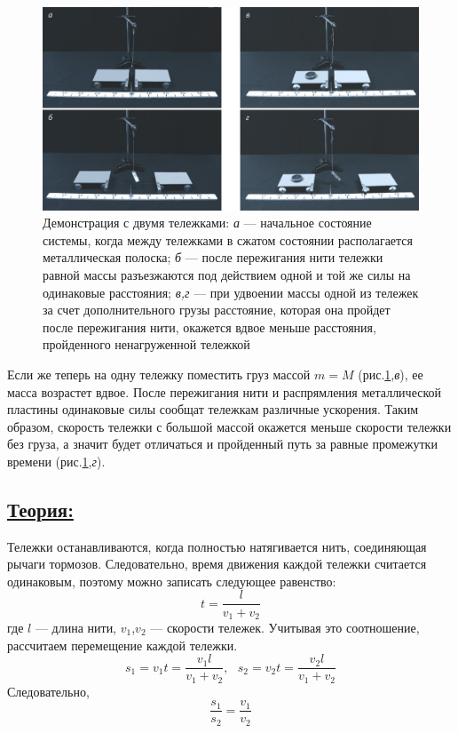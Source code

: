 \documentclass[14pt,a4paper,oneside]{extarticle}	%
\begin{document}
\begin{figure}[H]
	\centering
	\includegraphics[width=1\linewidth]{newton-2.png}
	\caption{Демонстрация с двумя тележками: \textit{а} — начальное состояние системы, когда между тележками в сжатом состоянии располагается металлическая полоска; \textit{б} — после пережигания нити тележки равной массы разъезжаются под действием одной и той же силы на одинаковые расстояния; \textit{в,г} — при удвоении массы одной из тележек за счет дополнительного грузы расстояние, которая она пройдет после пережигания нити, окажется вдвое меньше расстояния, пройденного ненагруженной тележкой}
	\label{newton-2}
\end{figure}

Если же теперь на одну тележку поместить груз массой  $ m=M $ (рис.\ref{newton-2},\textit{в}), ее масса возрастет вдвое.
После пережигания нити и распрямления металлической пластины одинаковые силы сообщат тележкам различные ускорения.
Таким образом, скорость тележки с большой массой окажется меньше скорости тележки без груза, а значит будет отличаться и пройденный путь за равные промежутки времени (рис.\ref{newton-2},\textit{г}).

\newpage
\subsection*{\underline{Теория:}}

Тележки останавливаются, когда полностью натягивается нить, соединяющая рычаги тормозов. 
Следовательно, время движения каждой тележки считается одинаковым, поэтому можно записать следующее равенство:
\begin{equation}\label{newton-eq1}
 t = \frac{l}{v_{1} + v_{2}}
\end{equation}
где $ l $ — длина нити, $ v_{1} $,$ v_{2} $ — скорости тележек. 
Учитывая это соотношение, рассчитаем перемещение каждой тележки.
 \begin{equation}\label{newton-eq2}
 s_{1} = v_{1}t = \frac{v_{1}l}{v_{1} + v_{2}}, \text{   }
  s_{2} = v_{2}t = \frac{v_{2}l}{v_{1} + v_{2}}
 \end{equation}
 Следовательно,
  \begin{equation}\label{newton-eq3}
 \frac{s_{1}}{s_{2}} = \frac{v_{1}}{v_{2}}
 \end{equation}
 
\end{document}
